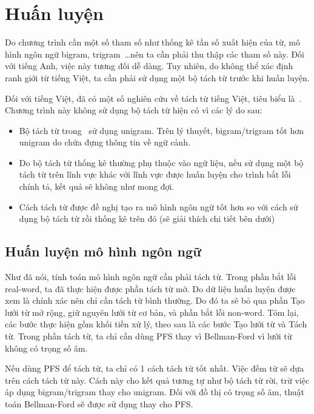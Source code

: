 \documentclass[a4paper,oneside,14pt]{extbook} %
\begin{document}
\section{Huấn luyện}
\label{sec:training}

Do chương trình cần một số tham số như thống kê tần số xuất hiện của
từ, mô hình ngôn ngữ bigram, trigram~\ldots nên ta cần phải thu thập
các tham số này. Đối với tiếng Anh, việc này tương đối dễ dàng. Tuy
nhiên, do không thể xác định ranh giới từ tiếng Việt, ta cần phải sử
dụng một bộ tách từ trước khi huấn luyện.

Đối với tiếng Việt, đã có một số nghiên cứu về tách từ tiếng Việt,
tiêu biểu là~\cite{Tachtu}. Chương trình này không sử dụng bộ tách từ
hiện có vì các lý do sau:
\begin{itemize}
\item Bộ tách từ trong~\cite{Tachtu} sử dụng unigram. Trên lý thuyết,
  bigram/trigram tốt hơn unigram do chứa đựng thông tin về ngữ cảnh.
\item Do bộ tách từ thống kê thường phụ thuộc vào ngữ liệu, nếu sử
  dụng một bộ tách từ trên lĩnh vực khác với lĩnh vực được huấn luyện
  cho trình bắt lỗi chính tả, kết quả sẽ không như mong đợi.
\item Cách tách từ được đề nghị tạo ra mô hình ngôn ngữ tốt hơn so với
  cách sử dụng bộ tách từ rồi thống kê trên đó (sẽ giải thích chi tiết
  bên dưới)
\end{itemize}

\subsection{Huấn luyện mô hình ngôn ngữ}

Như đã nói, tính toán mô hình ngôn ngữ cần phải tách từ. Trong phần
bắt lỗi real-word, ta đã thực hiện được phần tách từ mờ. Do dữ liệu
huấn luyện được xem là chính xác nên chỉ cần tách từ bình thường. Do
đó ta sẽ bỏ qua phần Tạo lưới từ mở rộng, giữ nguyên lưới từ cơ
bản, và phần bắt lỗi non-word. Tóm lại, các bước thực hiện gồm khối
tiền xử lý, theo sau là các bước Tạo lưới từ và Tách từ. Trong phần
tách từ, ta chỉ cần dùng PFS thay vì Bellman-Ford vì lưới từ không có
trọng số âm.


Nếu dùng PFS để tách từ, ta chỉ có 1 cách tách từ tốt nhất. Việc đếm
từ sẽ dựa trên cách tách từ này. Cách này cho kết quả tương tự như bộ
tách từ rời, trừ việc áp dụng bigram/trigram thay cho unigram. Đối với
đồ thị có trọng số âm, thuật toán Bellman-Ford sẽ được sử dụng thay
cho PFS.
\end{document}
